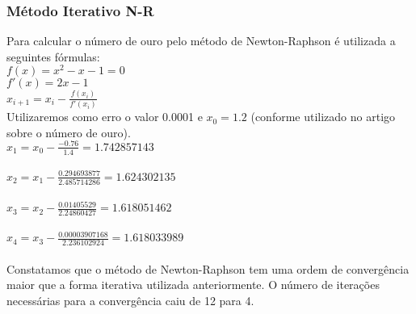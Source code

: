 \documentclass[11pt]{article}
\begin{document}
\subsubsection{Método Iterativo N-R}
Para calcular o número de ouro pelo método de Newton-Raphson é utilizada a seguintes fórmulas: \\
$f(x) = x^2 - x - 1 = 0$ \\
$f'(x) = 2x - 1$\\
$x_{i+1} = x_i - \frac{f(x_i)}{f'(x_i)}$ \\
Utilizaremos como erro o valor 0.0001 e $x_0 = 1.2$ (conforme utilizado no artigo sobre o número de ouro). \\
$x_1 = x_0 - \frac{-0.76}{1.4} = 1.742857143$ \\
\\
$x_2 = x_1 - \frac{0.294693877}{2.485714286} = 1.624302135$ \\
\\
$x_3 = x_2 - \frac{0.01405529}{2.24860427} = 1.618051462$ \\
\\
$x_4 = x_3 - \frac{0.00003907168}{2.236102924} = 1.618033989$ \\
\\

Constatamos que o método de Newton-Raphson tem uma ordem de convergência maior que a forma iterativa utilizada anteriormente.
O número de iterações necessárias para a convergência caiu de 12 para 4. \\
\end{document}

